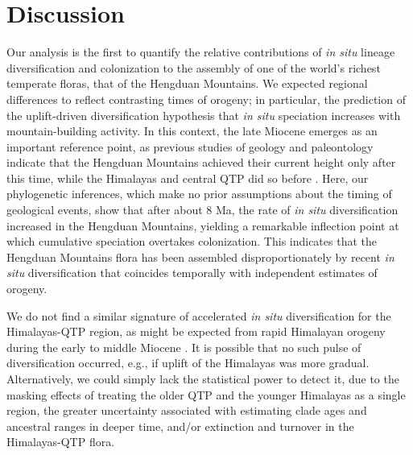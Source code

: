 \section*{Discussion}

Our analysis is the first to quantify the relative contributions of
\textit{in situ} lineage diversification and colonization to the
assembly of one of the world's richest temperate floras, that of the
Hengduan Mountains. We expected regional differences to reflect
contrasting times of orogeny; in particular, the prediction of the
uplift-driven diversification hypothesis that \textit{in situ}
speciation increases with mountain-building activity. In this context,
the late Miocene emerges as an important reference point, as previous
studies of geology and paleontology indicate that the Hengduan
Mountains achieved their current height only after this time, while
the Himalayas and central QTP did so before
\citep{WangY2012,Wang2014,Spicer2003,Favre2015,Renner2016}. Here, our
phylogenetic inferences, which make no prior assumptions about the
timing of geological events, show that after about 8 Ma, the rate of
\textit{in situ} diversification increased in the Hengduan Mountains,
yielding a remarkable inflection point at which cumulative speciation
overtakes colonization. This indicates that the Hengduan Mountains
flora has been assembled disproportionately by recent \textit{in situ}
diversification that coincides temporally with independent estimates
of orogeny.

We do not find a similar signature of accelerated \textit{in situ}
diversification for the Himalayas-QTP region, as might be expected
from rapid Himalayan orogeny during the early to middle Miocene
\citep{searle2011,Spicer2003,Wang2014}. It is possible that no such
pulse of diversification occurred, e.g., if uplift of the Himalayas
was more gradual. Alternatively, we could simply lack the statistical
power to detect it, due to the masking effects of treating the older
QTP and the younger Himalayas as a single region, the greater
uncertainty associated with estimating clade ages and ancestral ranges
in deeper time, and/or extinction and turnover in the Himalayas-QTP
flora.

